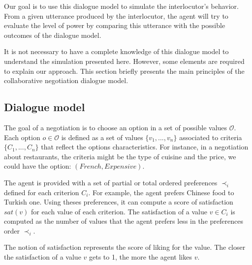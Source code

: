 \documentclass[conference, letterpaper]{IEEEtran}
\begin{document}
	Our goal is to use this dialogue model to simulate the interlocutor's behavior. From a given utterance produced by the interlocutor, the agent will try to evaluate the level of power by comparing this utterance with the possible outcomes of the dialogue model.
	
	It is not necessary to have a complete knowledge of this dialogue model to understand the simulation presented here. However, some elements are required to explain our approach. This section briefly presents the main principles of the collaborative negotiation dialogue model.
	
	\subsection{Dialogue model}
	\label{sec:dialogue-model}
	
	The goal of a negotiation is to choose an option in a set of possible values $\mathcal{O}$. Each option $o\in\mathcal{O}$ is defined as a set of values $\{v_1, ..., v_n\}$ associated to criteria $\{C_1, ..., C_n\}$ that reflect the options characteristics.  For instance, in a negotiation about restaurants, the criteria might be the type of cuisine and the price, we could have the option: $(French,Expensive)$.
	
	The agent is provided with a set of partial or total ordered preferences $\prec_i$ defined for each criterion $C_i$. For example, the agent prefers Chinese food to Turkish one. Using theses preferences, it can compute a score of satisfaction $sat(v)$ for each value of each criterion. The satisfaction of a value $v \in C_i$ is computed as the number of values that the agent prefers less in the preferences order $\prec_i$.
	
	The notion of satisfaction represents the score of liking for the value. The closer the satisfaction of a value $v$ gets to 1, the more the agent likes $v$.
	
\end{document}
